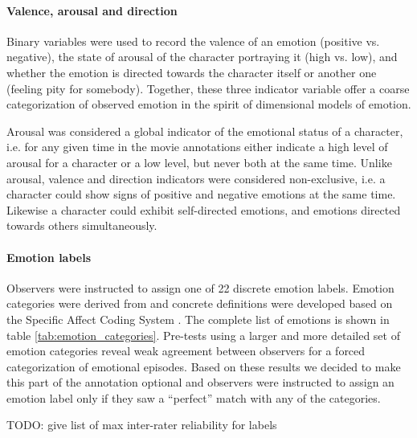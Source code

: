 \paragraph{Valence, arousal and direction}

Binary variables were used to record the valence of an emotion (positive vs.
negative), the state of arousal of the character portraying it (high vs. low),
and whether the emotion is directed towards the character itself or another one
(feeling pity for somebody). Together, these three indicator variable offer a
coarse categorization of observed emotion in the spirit of dimensional models
of emotion.

Arousal was considered a global indicator of the emotional status of a
character, i.e. for any given time in the movie annotations either indicate a
high level of arousal for a character or a low level, but never both at the
same time. Unlike arousal, valence and direction indicators were considered
non-exclusive, i.e. a character could show signs of positive and negative
emotions at the same time. Likewise a character could exhibit self-directed
emotions, and emotions directed towards others simultaneously.

\paragraph{Emotion labels}

Observers were instructed to assign one of 22 discrete emotion labels. Emotion
categories were derived from \cite{Ort1990} and concrete definitions were
developed based on the Specific Affect Coding System \cite{CG2007}. The
complete list of emotions is shown in table \ref{tab:emotion_categories}.
Pre-tests using a larger and more detailed set of emotion categories reveal
weak agreement between observers for a forced categorization of emotional
episodes. Based on these results we decided to make this part of the annotation
optional and observers were instructed to assign an emotion label only if they
saw a ``perfect'' match with any of the categories.

TODO: give list of max inter-rater reliability for labels

